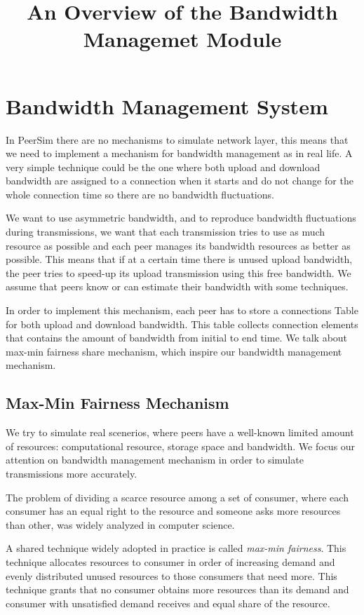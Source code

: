 

\title{An Overview of the Bandwidth Managemet Module}
\section{Bandwidth Management System}
In PeerSim there are no mechanisms to simulate network layer, this means that we need to implement a mechanism for bandwidth management as in real life. A very simple technique could be the one where both upload and download bandwidth are assigned to a connection when it starts and do not change for the whole connection time so there are no bandwidth fluctuations.

We want to use asymmetric bandwidth, and to reproduce bandwidth fluctuations during transmissions, we want that each transmission tries to use as much resource as possible and each peer manages its bandwidth resources as better as possible. This means that if at a certain time there is unused upload bandwidth, the peer tries to speed-up its upload transmission using this free bandwidth. We assume that peers know or can estimate their bandwidth with some techniques.

In order to implement this mechanism, each peer has to store a connections Table for both upload and download bandwidth. This table collects connection elements that contains the amount of bandwidth from initial to end time. We talk about max-min fairness share mechanism, which inspire our bandwidth management mechanism.

\subsection{Max-Min Fairness Mechanism}\label{sub:max-min-fair-mechanism}
We try to simulate real scenerios, where peers have a well-known limited amount of resources: computational resource, storage space and bandwidth. We focus our attention on bandwidth management mechanism in order to simulate transmissions more accurately.

The problem of dividing a scarce resource among a set of consumer, where each consumer has an equal right to the resource and someone asks more resources than other, was widely analyzed in computer science. 

A shared technique widely adopted in practice is called \textit{max-min fairness}. This technique allocates resources to consumer in order of increasing demand and evenly distributed unused resources to those consumers that need more. This technique grants that no consumer obtains more resources than its demand and consumer with unsatisfied demand receives and equal share of the resource.

